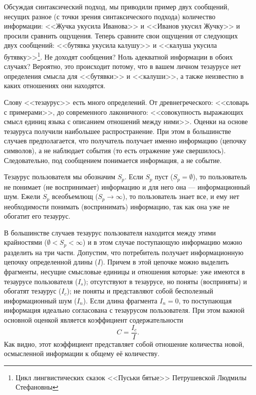 Обсуждая синтаксический подход, мы приводили пример двух сообщений, несущих разное (с точки зрения синтаксического подхода) количество информации: <<Жучка укусила Иванова>> и <<Иванов укусил Жучку>> и просили сравнить ощущения. Теперь сравните свои ощущения от следующих двух сообщений: <<бутявка укусила калушу>> и <<калуша укусила бутявку>>\footnote{Цикл лингвистических сказок <<Пуськи бятые>> Петрушевской Людмилы Стефановны}. Не доходят сообщения? Ноль адекватной информации в обоих случаях? Вероятно, это происходит потому, что в вашем личном тезаурусе нет определения смысла для <<бутявки>> и <<калуши>>, а также неизвестно в каких отношениях они находятся.

Слову <<тезаурус>> есть много определений. От древнегреческого: <<словарь с примерами>>, до современного лаконичного: <<совокупность выражающих смысл единиц языка с описанием отношений между ними>>. Оценки на основе тезауруса получили наибольшее распространение. При этом в большинстве случаев предполагается, что получатель получает именно информацию (цепочку символов), а не наблюдает события (то есть отражение уже свершилось). Следовательно, под сообщением понимается информация, а не событие.

Тезаурус пользователя мы обозначим $S_p$. Если $S_p$ пуст ($S_p=\emptyset$), то пользователь не понимает (не воспринимает) информацию и для него она --- информационный шум. Ежели $S_p$ всеобъемлющ ($S_p\rightarrow\infty$), то пользователь знает все, и ему нет необходимости понимать (воспринимать) информацию, так как она уже не обогатит его тезаурус. 

В большинстве случаев тезаурус пользователя находится между этими крайностями ($\emptyset<S_p<\infty$) и в этом случае поступающую информацию можно разделить на три части. Допустим, что потребитель получает информационную цепочку определенной длины ($I$). Причем в этой цепочке можно выделить фрагменты, несущие смысловые единицы и отношения которые: уже имеются в тезаурусе пользователя ($I_s$); отсутствуют в тезаурусе, но поняты (восприняты) и обогатят тезаурус ($I_c$); не поняты и представляют собой бесполезный информационный шум ($I_n$). Если длина фрагмента $I_n=0$, то поступающая информация идеально согласована с тезаурусом пользователя. При этом важной основной оценкой является коэффициент содержательности
\[C=\frac{I_c}{I}.\]
Как видно, этот коэффициент представляет собой отношение количества новой, осмысленной информации к общему её количеству.

